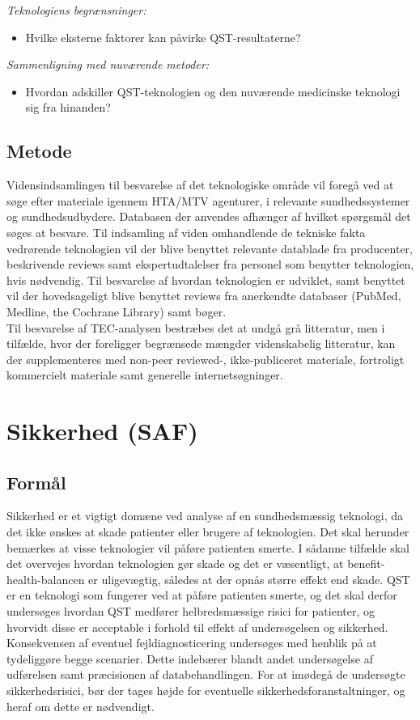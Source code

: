 \textit{Teknologiens begrænsninger:}
\begin{itemize}
\item Hvilke eksterne faktorer kan påvirke QST-resultaterne?
\end{itemize}

\textit{Sammenligning med nuværende metoder:}
\begin{itemize}
\item Hvordan adskiller QST-teknologien og den nuværende medicinske teknologi sig fra hinanden? %
\end{itemize}

\subsection{Metode \citep{HTAcore}}
Vidensindsamlingen til besvarelse af det teknologiske område vil foregå ved at søge efter materiale igennem HTA/MTV agenturer, i relevante sundhedssystemer og sundhedsudbydere. Databasen der anvendes afhænger af hvilket spørgsmål det søges at besvare. Til indsamling af viden omhandlende de tekniske fakta vedrørende teknologien vil der blive benyttet relevante datablade fra producenter, beskrivende reviews samt ekspertudtalelser fra personel som benytter teknologien, hvis nødvendig. Til besvarelse af hvordan teknologien er udviklet, samt benyttet vil der hovedsageligt blive benyttet reviews fra anerkendte databaser (PubMed, Medline, the Cochrane Library) samt bøger.  \\
Til besvarelse af TEC-analysen bestræbes det at undgå grå litteratur, men i tilfælde, hvor der foreligger begrænsede mængder videnskabelig litteratur, kan der supplementeres med non-peer reviewed-, ikke-publiceret materiale, fortroligt kommercielt materiale samt generelle internetsøgninger.

\section{Sikkerhed (SAF)}
\subsection{Formål}  %
Sikkerhed er et vigtigt domæne ved analyse af en sundhedsmæssig teknologi, da det ikke ønskes at skade patienter eller brugere af teknologien. Det skal herunder bemærkes at visse teknologier vil påføre patienten smerte. I sådanne tilfælde skal det overvejes hvordan teknologien gør skade og det er væsentligt, at benefit-health-balancen er uligevægtig, således at der opnås større effekt end skade. QST er en teknologi som fungerer ved at påføre patienten smerte, og det skal derfor undersøges hvordan QST medfører helbredsmæssige risici for patienter, og hvorvidt disse er acceptable i forhold til effekt af undersøgelsen og sikkerhed. 
Konsekvensen af eventuel fejldiagnosticering undersøges med henblik på at tydeliggøre begge scenarier. Dette indebærer blandt andet undersøgelse af udførelsen samt præcisionen af databehandlingen. For at imødegå de undersøgte sikkerhedsrisici, bør der tages højde for eventuelle sikkerhedsforanstaltninger, og heraf om dette er nødvendigt. 

